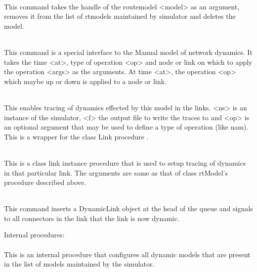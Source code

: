 \begin{flushleft}
\\
This command takes the handle of the routemodel <model> as an argument,
removes  it from the list of rtmodels maintained by simulator and deletes
the model.


\\
This command is a special interface to the Manual model of network dynamics.
It takes the time <at>, type of operation <op> and node or link on which
to apply the operation <args> as the arguments. At time <at>, the operation <op>
which maybe up or down is applied to a node or link.

\\
This enables tracing of dynamics effected by this model in the links. <ns>
is an instance of the simulator, <f> the output file to write the traces to
and <op> is an optional argument that may be used to define a type of
operation (like nam). This is a wrapper for the class Link procedure
.


\\
This is a class link instance procedure that is used to setup tracing of
dynamics in that particular link. The arguments are same as that of class
rtModel's procedure  described above.


\\
This command inserts a DynamicLink object at the head of the queue and signals
to all connectors in the link that the link is now dynamic.


Internal procedures:\\

\\
This is an internal procedure that configures all dynamic models that are
present in the list of models maintained by the simulator.

\end{flushleft}

\endinput

### Local Variables:
### mode: latex
### comment-column: 60
### backup-by-copying-when-linked: t
### file-precious-flag: nil
### End:
